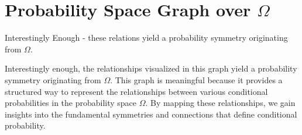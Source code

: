 \documentclass[
  12 pt,
  a4paper,
]{book}
\numberwithin{equation}{section}
\theoremstyle{plain}      %
\theoremstyle{definition} %
\theoremstyle{remark}     %
\theoremstyle{note}         %
\begin{document}
\newpage

\hypertarget{probability-space-graph-over-omega}{%
\section{\texorpdfstring{Probability Space Graph over
\(\Omega\)}{Probability Space Graph over \textbackslash Omega}}\label{probability-space-graph-over-omega}}

Interestingly Enough - these relations yield a probability symmetry
originating from \(\Omega\).

Interestingly enough, the relationships visualized in this graph yield a
probability symmetry originating from \(\Omega\). This graph is
meaningful because it provides a structured way to represent the
relationships between various conditional probabilities in the
probability space \(\Omega\). By mapping these relationships, we gain
insights into the fundamental symmetries and connections that define
conditional probability.
\end{document}
